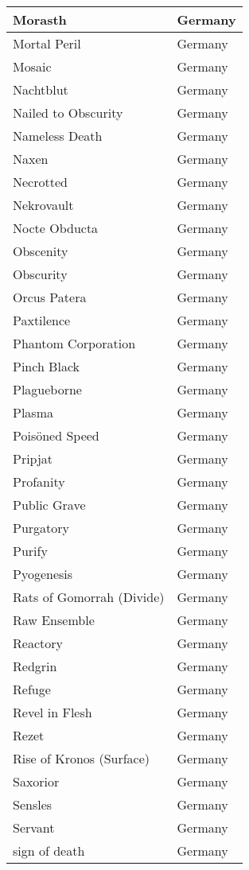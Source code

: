 \documentclass[12pt, a4paper, twoside]{report}
\begin{document}
\begin{center}
\begin{longtable}{|p{5cm}|p{5cm}|}
Morasth & Germany \\ \hline
Mortal Peril & Germany \\ \hline
Mosaic & Germany \\ \hline
Nachtblut & Germany \\ \hline
Nailed to Obscurity & Germany \\ \hline
Nameless Death & Germany \\ \hline
Naxen & Germany \\ \hline
Necrotted & Germany \\ \hline
Nekrovault & Germany \\ \hline
Nocte Obducta & Germany \\ \hline
Obscenity & Germany \\ \hline
Obscurity & Germany \\ \hline
Orcus Patera & Germany \\ \hline
Paxtilence & Germany \\ \hline
Phantom Corporation & Germany \\ \hline
Pinch Black & Germany \\ \hline
Plagueborne & Germany \\ \hline
Plasma & Germany \\ \hline
Poisöned Speed & Germany \\ \hline
Pripjat & Germany \\ \hline
Profanity & Germany \\ \hline
Public Grave & Germany \\ \hline
Purgatory & Germany \\ \hline
Purify & Germany \\ \hline
Pyogenesis & Germany \\ \hline
Rats of Gomorrah (Divide) & Germany \\ \hline
Raw Ensemble & Germany \\ \hline
Reactory & Germany \\ \hline
Redgrin & Germany \\ \hline
Refuge & Germany \\ \hline
Revel in Flesh & Germany \\ \hline
Rezet & Germany \\ \hline
Rise of Kronos (Surface) & Germany \\ \hline
Saxorior & Germany \\ \hline
Sensles & Germany \\ \hline
Servant & Germany \\ \hline
sign of death & Germany \\ \hline

\end{longtable}
\end{center}
\end{document}
